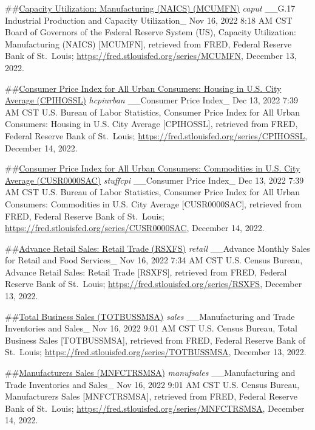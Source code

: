 \documentclass[
]{article}
\begin{document}
\#\#\href{https://fred.stlouisfed.org/series/MCUMFN}{Capacity
Utilization: Manufacturing (NAICS) (MCUMFN)} \emph{caput} \_\_G.17
Industrial Production and Capacity Utilization\_ Nov 16, 2022 8:18 AM
CST Board of Governors of the Federal Reserve System (US), Capacity
Utilization: Manufacturing (NAICS) {[}MCUMFN{]}, retrieved from FRED,
Federal Reserve Bank of St.~Louis;
\url{https://fred.stlouisfed.org/series/MCUMFN}, December 13, 2022.

\#\#\href{https://fred.stlouisfed.org/series/CPIHOSSL}{Consumer Price
Index for All Urban Consumers: Housing in U.S. City Average (CPIHOSSL)}
\emph{hcpiurban} \_\_Consumer Price Index\_ Dec 13, 2022 7:39 AM CST
U.S. Bureau of Labor Statistics, Consumer Price Index for All Urban
Consumers: Housing in U.S. City Average {[}CPIHOSSL{]}, retrieved from
FRED, Federal Reserve Bank of St.~Louis;
\url{https://fred.stlouisfed.org/series/CPIHOSSL}, December 14, 2022.

\#\#\href{https://fred.stlouisfed.org/series/CUSR0000SAC}{Consumer Price
Index for All Urban Consumers: Commodities in U.S. City Average
(CUSR0000SAC)} \emph{stuffcpi} \_\_Consumer Price Index\_ Dec 13, 2022
7:39 AM CST U.S. Bureau of Labor Statistics, Consumer Price Index for
All Urban Consumers: Commodities in U.S. City Average {[}CUSR0000SAC{]},
retrieved from FRED, Federal Reserve Bank of St.~Louis;
\url{https://fred.stlouisfed.org/series/CUSR0000SAC}, December 14, 2022.

\#\#\href{https://fred.stlouisfed.org/series/RSXFS}{Advance Retail
Sales: Retail Trade (RSXFS)} \emph{retail} \_\_Advance Monthly Sales for
Retail and Food Services\_ Nov 16, 2022 7:34 AM CST U.S. Census Bureau,
Advance Retail Sales: Retail Trade {[}RSXFS{]}, retrieved from FRED,
Federal Reserve Bank of St.~Louis;
\url{https://fred.stlouisfed.org/series/RSXFS}, December 13, 2022.

\#\#\href{https://fred.stlouisfed.org/series/TOTBUSSMSA}{Total Business
Sales (TOTBUSSMSA)} \emph{sales} \_\_Manufacturing and Trade Inventories
and Sales\_ Nov 16, 2022 9:01 AM CST U.S. Census Bureau, Total Business
Sales {[}TOTBUSSMSA{]}, retrieved from FRED, Federal Reserve Bank of
St.~Louis; \url{https://fred.stlouisfed.org/series/TOTBUSSMSA}, December
13, 2022.

\#\#\href{https://fred.stlouisfed.org/series/MNFCTRSMSA}{Manufacturers
Sales (MNFCTRSMSA)} \emph{manufsales} \_\_Manufacturing and Trade
Inventories and Sales\_ Nov 16, 2022 9:01 AM CST U.S. Census Bureau,
Manufacturers Sales {[}MNFCTRSMSA{]}, retrieved from FRED, Federal
Reserve Bank of St.~Louis;
\url{https://fred.stlouisfed.org/series/MNFCTRSMSA}, December 14, 2022.
\end{document}
